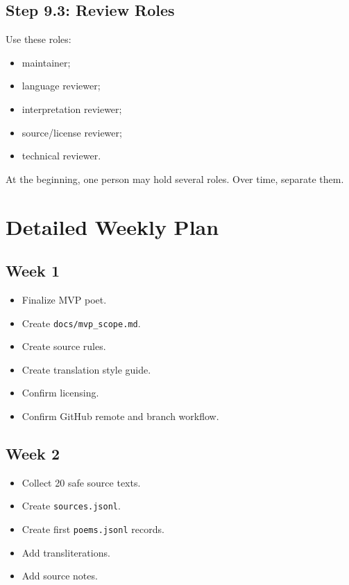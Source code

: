 \documentclass[11pt]{article}
\begin{document}
\subsection{Step 9.3: Review Roles}

Use these roles:

\begin{itemize}
  \item maintainer;
  \item language reviewer;
  \item interpretation reviewer;
  \item source/license reviewer;
  \item technical reviewer.
\end{itemize}

At the beginning, one person may hold several roles. Over time, separate them.

\section{Detailed Weekly Plan}

\subsection{Week 1}

\begin{itemize}
  \item Finalize MVP poet.
  \item Create \verb|docs/mvp_scope.md|.
  \item Create source rules.
  \item Create translation style guide.
  \item Confirm licensing.
  \item Confirm GitHub remote and branch workflow.
\end{itemize}

\subsection{Week 2}

\begin{itemize}
  \item Collect 20 safe source texts.
  \item Create \verb|sources.jsonl|.
  \item Create first \verb|poems.jsonl| records.
  \item Add transliterations.
  \item Add source notes.
\end{itemize}
\end{document}

